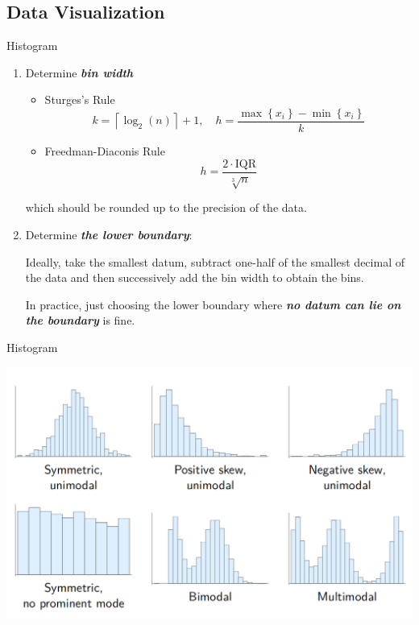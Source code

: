 \documentclass{beamer}
\newcommand{\bb}[1]{\textcolor{antiquefuchsia}{\textbf{\textit{#1}}}}
\begin{document}
\subsection{Data Visualization}
\begin{frame}{Histogram}
\begin{enumerate}
\item Determine \bb{bin width}
\begin{itemize}
\item{Sturges's Rule}
$$
k=\left\lceil\log _{2}(n)\right\rceil+1
,\quad
h=\frac{\max \left\{x_{i}\right\}-\min \left\{x_{i}\right\}}{k}
$$

\item{Freedman-Diaconis Rule}
$$
h=\frac{2 \cdot \mathrm{IQR}}{\sqrt[3]{n}}
$$
\end{itemize}

which should be rounded up to the precision of the data.

\item Determine \bb{the lower boundary}:

Ideally, take the smallest datum, subtract one-half of the smallest decimal of the data and then successively add the bin width to obtain the bins.

In practice, just choosing the lower boundary where \bb{no datum can lie on the boundary} is fine.
\end{enumerate}
\end{frame}

\begin{frame}{Histogram}
\begin{center}
\includegraphics[scale=0.4]{hist.png}
\end{center}
\end{frame}
\end{document}
